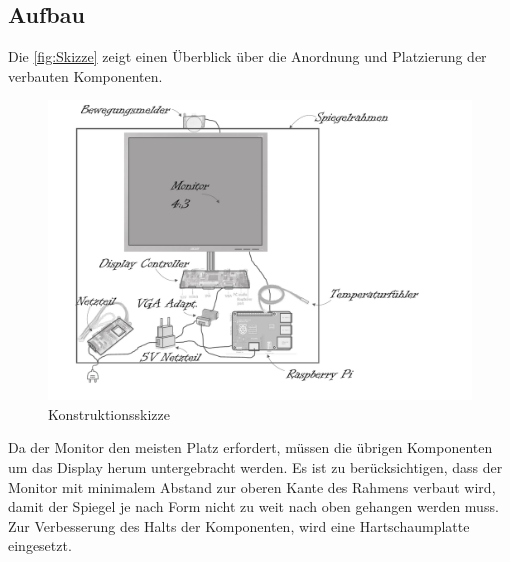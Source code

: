 \subsection{Aufbau}
Die \autoref{fig:Skizze} zeigt einen Überblick über die Anordnung und Platzierung der verbauten Komponenten. 
\begin{figure}
	\includegraphics[scale=0.5, trim=0mm 10mm 60mm 10mm]{bilder/smartMirrorExplosionsskizze.pdf}
	\caption{Konstruktionsskizze}
	\label{fig:Skizze}
\end{figure}
Da der Monitor den meisten Platz erfordert, müssen die übrigen Komponenten um das Display herum untergebracht werden. Es ist zu berücksichtigen, dass der Monitor mit  minimalem Abstand zur oberen Kante des Rahmens verbaut wird, damit der Spiegel je nach Form nicht zu weit nach oben gehangen werden muss. Zur Verbesserung des Halts der Komponenten, wird eine Hartschaumplatte eingesetzt. 


